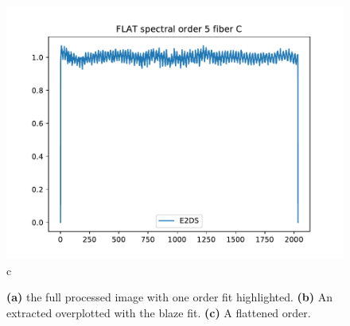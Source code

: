 \begin{figure}
\begin{center}
\begin{minipage}{.495\textwidth}
\begin{center}
\includegraphics[width=\textwidth]{Figures/cal_FF_raw_spirou_3.pdf}
c
\end{center}
\end{minipage}%
\end{center}

\caption{\textbf{(a)} the full processed image with one order fit highlighted. \textbf{(b)} An extracted overplotted with the blaze fit. \textbf{(c)}  A flattened order. \label{figure:cal_FF_raw_spirou}}
\end{figure}